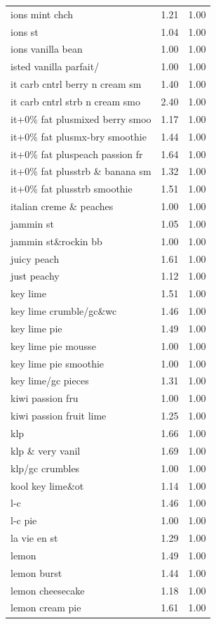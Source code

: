 \begin{table}
\begin{tabular}{lrr}
ions mint chch & 1.21 & 1.00 \\
ions st & 1.04 & 1.00 \\
ions vanilla bean & 1.00 & 1.00 \\
isted vanilla parfait/ & 1.00 & 1.00 \\
it carb cntrl berry n cream sm & 1.40 & 1.00 \\
it carb cntrl strb n cream smo & 2.40 & 1.00 \\
it+0\% fat plusmixed berry smoo & 1.17 & 1.00 \\
it+0\% fat plusmx-bry smoothie & 1.44 & 1.00 \\
it+0\% fat pluspeach passion fr & 1.64 & 1.00 \\
it+0\% fat plusstrb \& banana sm & 1.32 & 1.00 \\
it+0\% fat plusstrb smoothie & 1.51 & 1.00 \\
italian creme \& peaches & 1.00 & 1.00 \\
jammin st & 1.05 & 1.00 \\
jammin st\&rockin bb & 1.00 & 1.00 \\
juicy peach & 1.61 & 1.00 \\
just peachy & 1.12 & 1.00 \\
key lime & 1.51 & 1.00 \\
key lime crumble/gc\&wc & 1.46 & 1.00 \\
key lime pie & 1.49 & 1.00 \\
key lime pie mousse & 1.00 & 1.00 \\
key lime pie smoothie & 1.00 & 1.00 \\
key lime/gc pieces & 1.31 & 1.00 \\
kiwi passion fru & 1.00 & 1.00 \\
kiwi passion fruit lime & 1.25 & 1.00 \\
klp & 1.66 & 1.00 \\
klp \& very vanil & 1.69 & 1.00 \\
klp/gc crumbles & 1.00 & 1.00 \\
kool key lime\&ot & 1.14 & 1.00 \\
l-c & 1.46 & 1.00 \\
l-c pie & 1.00 & 1.00 \\
la vie en st & 1.29 & 1.00 \\
lemon & 1.49 & 1.00 \\
lemon burst & 1.44 & 1.00 \\
lemon cheesecake & 1.18 & 1.00 \\
lemon cream pie & 1.61 & 1.00 \\

\end{tabular}
\end{table}
